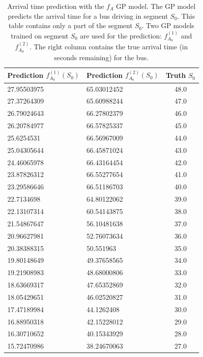  \begin{table}
    \centering
    \caption[Arrival time prediction with the $f_A$ GP model]%
    {{\small Arrival time prediction with the $f_A$ GP model.
    The GP model predicts the arrival time for a bus driving in segment $S_0$.
    This table contains only a part of the segment $S_0$.
    Two GP models trained on segment $S_0$ are used for the prediction: $f^{(1)}_{A_0}$ and $f^{(2)}_{A_0}$.
    The right column contains the true arrival time (in seconds remaining) for the bus.}}
    \label{table:f_A-examples} 
    \begin{tabular}{ |l|l|c| } 
        \hline
        Prediction $f^{(1)}_{A_0}(S_0)$ & Prediction $f^{(2)}_{A_0}(S_0)$ & Truth $S_0$ \\ [0.5ex] 
        \hline
        27.95503975 & 65.03012452 & 48.0 \\
        27.37264309 & 65.60988244 & 47.0 \\
        26.79024643 & 66.27802379 & 46.0 \\
        26.20784977 & 66.57825337 & 45.0 \\
        25.6254531 & 66.56967009 & 44.0 \\
        25.04305644 & 66.45871024 & 43.0 \\
        24.46065978 & 66.43164454 & 42.0 \\
        23.87826312 & 66.55277654 & 41.0 \\
        23.29586646 & 66.51186703 & 40.0 \\
        22.7134698 & 64.80122062 & 39.0 \\
        22.13107314 & 60.54143875 & 38.0 \\
        21.54867647 & 56.10481638 & 37.0 \\
        20.96627981 & 52.76073634 & 36.0 \\
        20.38388315 & 50.551963 & 35.0 \\
        19.80148649 & 49.37658565 & 34.0 \\
        19.21908983 & 48.68000806 & 33.0 \\
        18.63669317 & 47.65352869 & 32.0 \\
        18.05429651 & 46.02520827 & 31.0 \\
        17.47189984 & 44.1262408 & 30.0 \\
        16.88950318 & 42.15228012 & 29.0 \\
        16.30710652 & 40.15343929 & 28.0 \\
        15.72470986 & 38.24670063 & 27.0 \\

\end{tabular}
\end{table}
